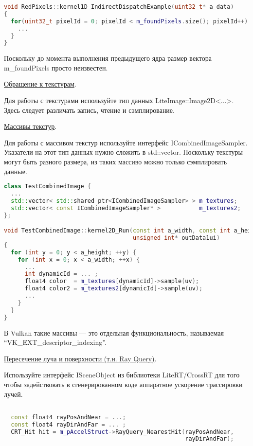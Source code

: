 \documentclass[11pt,fleqn,english,russian]{report} %
\begin{document}
\begin{lstlisting}[language=C++, 
	               caption=непрямой вызов ядра, 
	               label=lst:indirect_dispatch]	
void RedPixels::kernel1D_IndirectDispatchExample(uint32_t* a_data)
{
  for(uint32_t pixelId = 0; pixelId < m_foundPixels.size(); pixelId++) {
  	...
  }
}
\end{lstlisting}

Поскольку до момента выполнения предыдущего ядра размер вектора m\_foundPixels просто неизвестен.

\noindent\underline{Обращение к текстурам}.

Для работы с текстурами используйте тип данных LiteImage::Image2D<...>. Здесь следует различать запись, чтение и сэмплирование.

\noindent\underline{Массивы текстур}.

Для работы с массивом текстур используйте интерфейс ICombinedImageSampler.
Указатели на этот тип данных нужно сложить в std::vector. Поскольку текстуры могут быть разного размера, из таких массиво можно только сэмплировать данные.

\begin{lstlisting}[language=C++, 
	caption=сэмплирование из массива текстур, 
	label=lst:texarrays]	
class TestCombinedImage {
  ...  
  std::vector< std::shared_ptr<ICombinedImageSampler> > m_textures;
  std::vector< const ICombinedImageSampler* >           m_textures2;
};

void TestCombinedImage::kernel2D_Run(const int a_width, const int a_height, 
                                     unsigned int* outData1ui)
{
  for (int y = 0; y < a_height; ++y) {
    for (int x = 0; x < a_width; ++x) {  
      ...
      int dynamicId = ... ;			
      float4 color  = m_textures[dynamicId]->sample(uv); 
      float4 color2 = m_textures2[dynamicId]->sample(uv);     
      ...
    }
  }
}
\end{lstlisting}

В Vulkan такие массивы --- это отдельная функциональность, называемая \newline ``VK\_EXT\_descriptor\_indexing''. 

\noindent\underline{Пересечение луча и поверхности (т.н. Ray Query)}.

Используйте интерфейс ISceneObject из библиотеки LiteRT/CrossRT \cite{litert} для того чтобы задействовать в сгенерированном коде аппаратное ускорение трассировки лучей.

\begin{lstlisting}[language=C++, 
	caption=поиск пересечения луча и поверхности, 
	label=lst:ray_query_hit]

  const float4 rayPosAndNear = ...;
  const float4 rayDirAndFar = ... ;		
  CRT_Hit hit = m_pAccelStruct->RayQuery_NearestHit(rayPosAndNear, 
                                                    rayDirAndFar);

\end{lstlisting}
\end{document}
